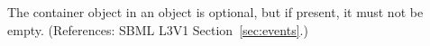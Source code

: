 The \ListOfEventAssignments container object in an \Event object is
optional, but if present, it must not be empty. (References: SBML L3V1
Section~\ref{sec:events}.)

